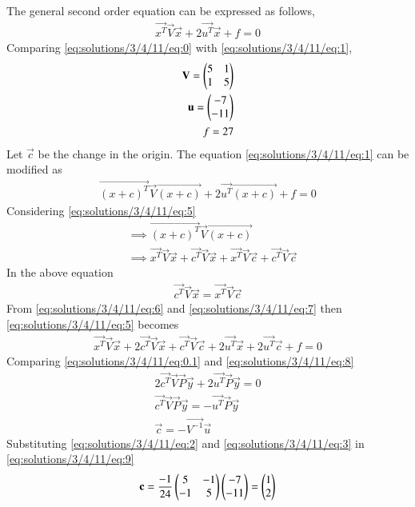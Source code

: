 The general second order equation can be expressed as follows,
\begin{align}
\vec{x^T}\vec{V}\vec{x}+2\vec{u^T}\vec{x}+f=0\label{eq:solutions/3/4/11/eq:1}
\end{align}
Comparing \eqref{eq:solutions/3/4/11/eq:0} with \eqref{eq:solutions/3/4/11/eq:1},
\begin{align}
\mathbf{V} = \begin{pmatrix}5 & 1\\1 & 5\end{pmatrix}\label{eq:solutions/3/4/11/eq:2}\\
\mathbf{u} = \begin{pmatrix}-7\\ -11\end{pmatrix}\label{eq:solutions/3/4/11/eq:3}\\
f = 27\label{eq:solutions/3/4/11/eq:4}
\end{align}
Let $\vec{c}$ be the change in the origin. The equation \eqref{eq:solutions/3/4/11/eq:1} can be modified as
\begin{align}
\vec{(x+c)^T}\vec{V}\vec{(x+c)}+2\vec{u^T}\vec{(x+c)}+f=0\label{eq:solutions/3/4/11/eq:5}
\end{align}
Considering \eqref{eq:solutions/3/4/11/eq:5}
\begin{align}
&\implies \vec{(x+c)^T}\vec{V}\vec{(x+c)}\\
&\implies \vec{x^T}\vec{V}\vec{x}+\vec{c^T}\vec{V}\vec{x}+\vec{x^T}\vec{V}\vec{c}+\vec{c^T}\vec{V}\vec{c}\label{eq:solutions/3/4/11/eq:6}
\end{align}
In the above equation
\begin{align}
\vec{c^T}\vec{V}\vec{x} = \vec{x^T}\vec{V}\vec{c}\label{eq:solutions/3/4/11/eq:7}
\end{align}
From \eqref{eq:solutions/3/4/11/eq:6} and \eqref{eq:solutions/3/4/11/eq:7} then \eqref{eq:solutions/3/4/11/eq:5} becomes
\begin{align}
\vec{x^T}\vec{V}\vec{x}+2\vec{c^T}\vec{V}\vec{x}+\vec{c^T}\vec{V}\vec{c}+2\vec{u^T}\vec{x}+2\vec{u^T}\vec{c}+f = 0\label{eq:solutions/3/4/11/eq:8}
\end{align}
Comparing \eqref{eq:solutions/3/4/11/eq:0.1} and \eqref{eq:solutions/3/4/11/eq:8}
\begin{align}
2\vec{c^T}\vec{V}\vec{P}\vec{y} + 2\vec{u^T}\vec{P}\vec{y} =0\\
\vec{c^T}\vec{V}\vec{P}\vec{y} = - \vec{u^T}\vec{P}\vec{y}\\
\vec{c} = -\vec{V^{-1}}\vec{u}\label{eq:solutions/3/4/11/eq:9}
\end{align}
Substituting \eqref{eq:solutions/3/4/11/eq:2} and \eqref{eq:solutions/3/4/11/eq:3} in \eqref{eq:solutions/3/4/11/eq:9}
\begin{align}
\mathbf{c}=\frac{-1}{24}\begin{pmatrix}5&-1\\-1&5\end{pmatrix}\begin{pmatrix}-7\\-11\end{pmatrix}=\begin{pmatrix}1\\2 \end{pmatrix}\label{eq:solutions/3/4/11/eq:10}
\end{align}
